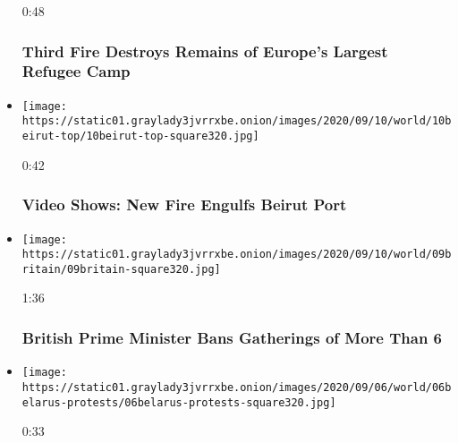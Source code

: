 \begin{itemize}
  0:48

  \hypertarget{third-fire-destroys-remains-of-europes-largest-refugee-camp}{%
  \subsubsection{Third Fire Destroys Remains of Europe's Largest Refugee
  Camp}\label{third-fire-destroys-remains-of-europes-largest-refugee-camp}}
\item
  \href{https://www.nytimes3xbfgragh.onion/video/world/europe/100000007333350/beirut-port-explosion.html?action=click\&module=video-series-bar\&region=header\&pgtype=Article\&playlistId=video/world}{}

  \texttt{[image: https://static01.graylady3jvrrxbe.onion/images/2020/09/10/world/10beirut-top/10beirut-top-square320.jpg]}

  0:42

  \hypertarget{video-shows-new-fire-engulfs-beirut-port}{%
  \subsubsection{Video Shows: New Fire Engulfs Beirut
  Port}\label{video-shows-new-fire-engulfs-beirut-port}}
\item
  \href{https://www.nytimes3xbfgragh.onion/video/world/europe/100000007331793/boris-johnson-covid-restrictions.html?action=click\&module=video-series-bar\&region=header\&pgtype=Article\&playlistId=video/world}{}

  \texttt{[image: https://static01.graylady3jvrrxbe.onion/images/2020/09/10/world/09britain/09britain-square320.jpg]}

  1:36

  \hypertarget{british-prime-minister-bans-gatherings-of-more-than-6}{%
  \subsubsection{British Prime Minister Bans Gatherings of More Than
  6}\label{british-prime-minister-bans-gatherings-of-more-than-6}}
\item
  \href{https://www.nytimes3xbfgragh.onion/video/world/europe/100000007327321/belarus-protest.html?action=click\&module=video-series-bar\&region=header\&pgtype=Article\&playlistId=video/world}{}

  \texttt{[image: https://static01.graylady3jvrrxbe.onion/images/2020/09/06/world/06belarus-protests/06belarus-protests-square320.jpg]}

  0:33


\end{itemize}
